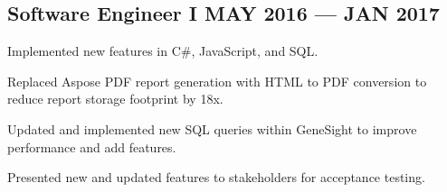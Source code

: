 \subsection{{Software Engineer I \hfill MAY 2016 --- JAN 2017}}
\begin{zitemize}
\item Implemented new features in C\#, JavaScript, and SQL.
\item Replaced Aspose PDF report generation with HTML to PDF conversion to reduce report storage footprint by 18x.
\item Updated and implemented new SQL queries within GeneSight to improve performance and add features.
\item Presented new and updated features to stakeholders for acceptance testing.
\end{zitemize}
